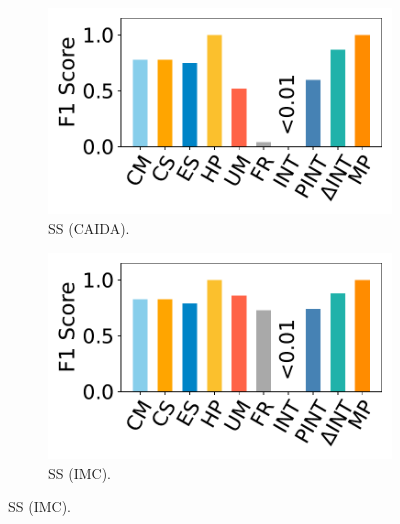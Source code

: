 \begin{figure}[t]
    \begin{subfigure}{0.49\linewidth}
    \centering
    \includegraphics[width=\linewidth]{pics/ssF1-caida.pdf}
    \vspace{-20pt}
    \caption{SS (CAIDA).}
    \end{subfigure}
    \begin{subfigure}{0.49\linewidth}
    \centering
    \includegraphics[width=\linewidth]{pics/ssF1-imc.pdf}
    \vspace{-20pt}
    \caption{SS (IMC).}
    \end{subfigure}
    

\end{figure}
